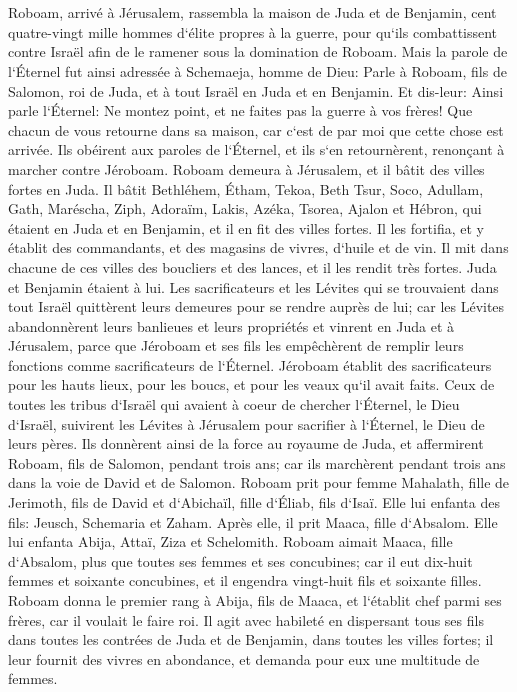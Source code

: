 \chapter{}

\verse Roboam, arrivé à Jérusalem, rassembla la maison de Juda et de Benjamin, cent quatre-vingt mille hommes d`élite propres à la guerre, pour qu`ils combattissent contre Israël afin de le ramener sous la domination de Roboam. 
\verse Mais la parole de l`Éternel fut ainsi adressée à Schemaeja, homme de Dieu: 
\verse Parle à Roboam, fils de Salomon, roi de Juda, et à tout Israël en Juda et en Benjamin. Et dis-leur: 
\verse Ainsi parle l`Éternel: Ne montez point, et ne faites pas la guerre à vos frères! Que chacun de vous retourne dans sa maison, car c`est de par moi que cette chose est arrivée. Ils obéirent aux paroles de l`Éternel, et ils s`en retournèrent, renonçant à marcher contre Jéroboam. 
\verse Roboam demeura à Jérusalem, et il bâtit des villes fortes en Juda. 
\verse Il bâtit Bethléhem, Étham, Tekoa, 
\verse Beth Tsur, Soco, Adullam, 
\verse Gath, Maréscha, Ziph, 
\verse Adoraïm, Lakis, Azéka, 
\verse Tsorea, Ajalon et Hébron, qui étaient en Juda et en Benjamin, et il en fit des villes fortes. 
\verse Il les fortifia, et y établit des commandants, et des magasins de vivres, d`huile et de vin. 
\verse Il mit dans chacune de ces villes des boucliers et des lances, et il les rendit très fortes. Juda et Benjamin étaient à lui. 
\verse Les sacrificateurs et les Lévites qui se trouvaient dans tout Israël quittèrent leurs demeures pour se rendre auprès de lui; 
\verse car les Lévites abandonnèrent leurs banlieues et leurs propriétés et vinrent en Juda et à Jérusalem, parce que Jéroboam et ses fils les empêchèrent de remplir leurs fonctions comme sacrificateurs de l`Éternel. 
\verse Jéroboam établit des sacrificateurs pour les hauts lieux, pour les boucs, et pour les veaux qu`il avait faits. 
\verse Ceux de toutes les tribus d`Israël qui avaient à coeur de chercher l`Éternel, le Dieu d`Israël, suivirent les Lévites à Jérusalem pour sacrifier à l`Éternel, le Dieu de leurs pères. 
\verse Ils donnèrent ainsi de la force au royaume de Juda, et affermirent Roboam, fils de Salomon, pendant trois ans; car ils marchèrent pendant trois ans dans la voie de David et de Salomon. 
\verse Roboam prit pour femme Mahalath, fille de Jerimoth, fils de David et d`Abichaïl, fille d`Éliab, fils d`Isaï. 
\verse Elle lui enfanta des fils: Jeusch, Schemaria et Zaham. 
\verse Après elle, il prit Maaca, fille d`Absalom. Elle lui enfanta Abija, Attaï, Ziza et Schelomith. 
\verse Roboam aimait Maaca, fille d`Absalom, plus que toutes ses femmes et ses concubines; car il eut dix-huit femmes et soixante concubines, et il engendra vingt-huit fils et soixante filles. 
\verse Roboam donna le premier rang à Abija, fils de Maaca, et l`établit chef parmi ses frères, car il voulait le faire roi. 
\verse Il agit avec habileté en dispersant tous ses fils dans toutes les contrées de Juda et de Benjamin, dans toutes les villes fortes; il leur fournit des vivres en abondance, et demanda pour eux une multitude de femmes. 

